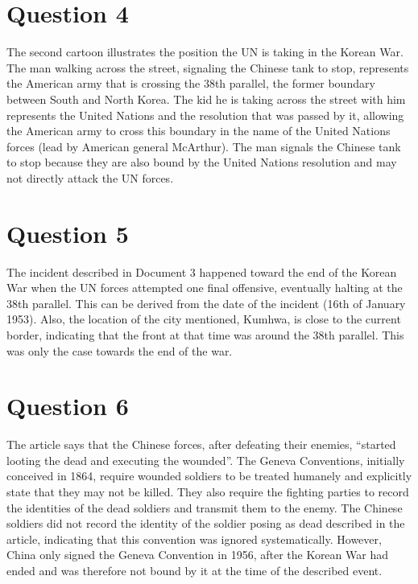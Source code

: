 \documentclass[11pt]{article}
\begin{document}
\section*{Question 4}
The second cartoon illustrates the position the UN is taking in the Korean War. The man walking across the street, signaling the Chinese tank to stop, represents the American army that is crossing the 38th parallel, the former boundary between South and North Korea. The kid he is taking across the street with him represents the United Nations and the resolution that was passed by it, allowing the American army to cross this boundary in the name of the United Nations forces (lead by American general McArthur). The man signals the Chinese tank to stop because they are also bound by the United Nations resolution and may not directly attack the UN forces.

\section*{Question 5}
The incident described in Document 3 happened toward the end of the Korean War when the UN forces attempted one final offensive, eventually halting at the 38th parallel. This can be derived from the date of the incident (16th of January 1953). Also, the location of the city mentioned, Kumhwa, is close to the current border, indicating that the front at that time was around the 38th parallel. This was only the case towards the end of the war.

\section*{Question 6}
The article says that the Chinese forces, after defeating their enemies, ``started looting the dead and executing the wounded''. The Geneva Conventions, initially conceived in 1864, require wounded soldiers to be treated humanely and explicitly state that they may not be killed. They also require the fighting parties to record the identities of the dead soldiers and transmit them to the enemy. The Chinese soldiers did not record the identity of the soldier posing as dead described in the article, indicating that this convention was ignored systematically. However, China only signed the Geneva Convention in 1956, after the Korean War had ended and was therefore not bound by it at the time of the described event.
\end{document}
